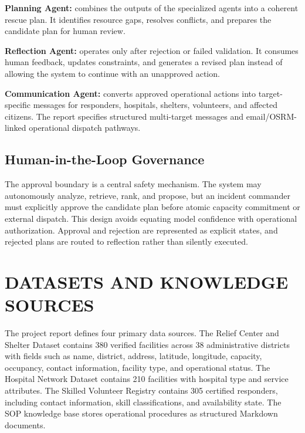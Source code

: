 \documentclass[conference]{IEEEtran}
\begin{document}
\textbf{Planning Agent:} combines the outputs of the specialized agents into a coherent rescue plan. It identifies resource gaps, resolves conflicts, and prepares the candidate plan for human review.

\textbf{Reflection Agent:} operates only after rejection or failed validation. It consumes human feedback, updates constraints, and generates a revised plan instead of allowing the system to continue with an unapproved action.

\textbf{Communication Agent:} converts approved operational actions into target-specific messages for responders, hospitals, shelters, volunteers, and affected citizens. The report specifies structured multi-target messages and email/OSRM-linked operational dispatch pathways.

\subsection{Human-in-the-Loop Governance}
The approval boundary is a central safety mechanism. The system may autonomously analyze, retrieve, rank, and propose, but an incident commander must explicitly approve the candidate plan before atomic capacity commitment or external dispatch. This design avoids equating model confidence with operational authorization. Approval and rejection are represented as explicit states, and rejected plans are routed to reflection rather than silently executed.

\section{DATASETS AND KNOWLEDGE SOURCES}
The project report defines four primary data sources. The Relief Center and Shelter Dataset contains 380 verified facilities across 38 administrative districts with fields such as name, district, address, latitude, longitude, capacity, occupancy, contact information, facility type, and operational status. The Hospital Network Dataset contains 210 facilities with hospital type and service attributes. The Skilled Volunteer Registry contains 305 certified responders, including contact information, skill classifications, and availability state. The SOP knowledge base stores operational procedures as structured Markdown documents.
\end{document}
